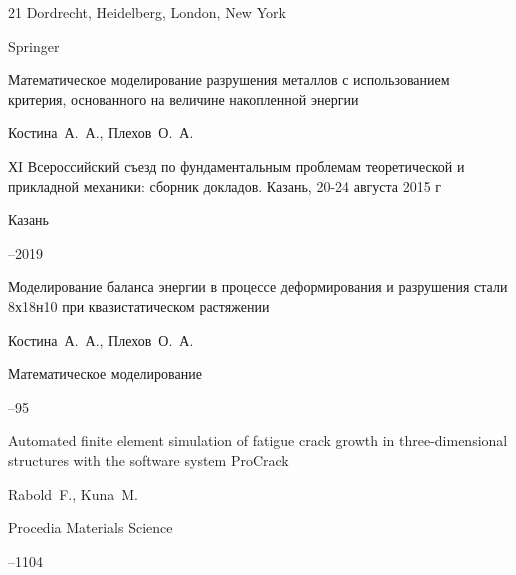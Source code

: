 \begin{thebibliography}{21}
\publaddr Dordrecht, Heidelberg, London, New York

\publ Springer






\paper Математическое моделирование разрушения металлов с использованием критерия, основанного на величине накопленной энергии

\by Костина~А.~А., Плехов~О.~А.

\inbook ХI Всероссийский съезд по фундаментальным проблемам теоретической и прикладной механики: сборник докладов. Казань, 20-24 августа 2015 г

\publaddr Казань


--2019




\paper Моделирование баланса энергии в процессе деформирования и разрушения стали 8х18н10 при квазистатическом растяжении

\by Костина~А.~А., Плехов~О.~А.

\jour Математическое моделирование



--95




\paper Automated finite element simulation of fatigue crack growth in three-dimensional structures with the software system ProCrack

\by Rabold~F., Kuna~M.

\jour Procedia Materials Science



--1104



\end{thebibliography}



\RuDate





\newpage







